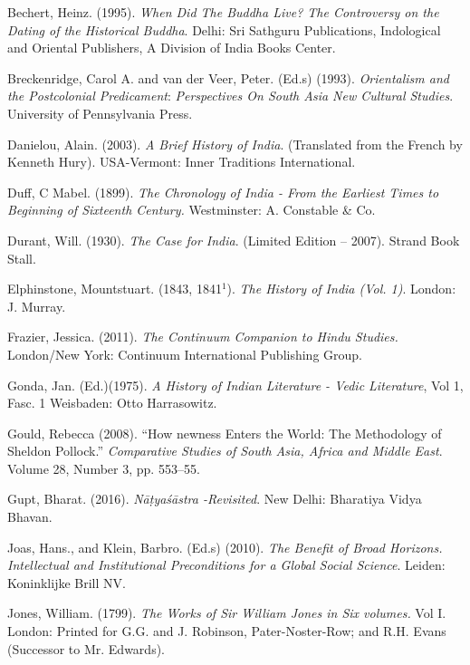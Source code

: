 \begin{thebibliography}{99}
\itemsep=1pt
 Bechert, Heinz. (1995). \textit{When Did The Buddha Live? The Controversy on the Dating of the Historical Buddha}. Delhi: Sri Sathguru Publications, Indological and Oriental Publishers, A Division of India Books Center.

  Breckenridge, Carol A. and van der Veer, Peter. (Ed.s) (1993). \textit{Orientalism and the Postcolonial Predicament}: \textit{Perspectives On South Asia New Cultural Studies}. University of Pennsylvania Press.

  Danielou, Alain. (2003). \textit{A Brief History of India}. (Translated from the French by Kenneth Hury). USA-Vermont: Inner Traditions International.

  Duff, C Mabel. (1899). \textit{The Chronology of India - From the Earliest Times to Beginning of Sixteenth Century.} Westminster: A. Constable \& Co.

  Durant, Will. (1930). \textit{The Case for India}. (Limited Edition – 2007). Strand Book Stall.

  Elphinstone, Mountstuart. (1843, 1841$^{1}$). \textit{The History of India (Vol. 1)}. London: J. Murray.

  Frazier, Jessica. (2011). \textit{The Continuum Companion to Hindu Studies.} London/New York: Continuum International Publishing Group.

  Gonda, Jan. (Ed.)(1975). \textit{A History of Indian Literature - Vedic Literature}, Vol 1, Fasc. 1 Weisbaden: Otto Harrasowitz.

  Gould, Rebecca (2008). “How newness Enters the World: The Methodology of Sheldon Pollock.” \textit{Comparative Studies of South Asia, Africa and Middle East}. Volume 28, Number 3, pp. 553--55.

  Gupt, Bharat. (2016). \textit{Nāṭyaśāstra -Revisited}. New Delhi: Bharatiya Vidya Bhavan.

  Joas, Hans., and Klein, Barbro. (Ed.s) (2010). \textit{The Benefit of Broad Horizons. Intellectual and Institutional Preconditions for a Global Social Science}. Leiden: Koninklijke Brill NV.

  Jones, William. (1799). \textit{ The Works of Sir William Jones in Six volumes.} Vol I. London: Printed for G.G. and J. Robinson, Pater-Noster-Row; and R.H. Evans (Successor to Mr. Edwards).


\end{thebibliography}
